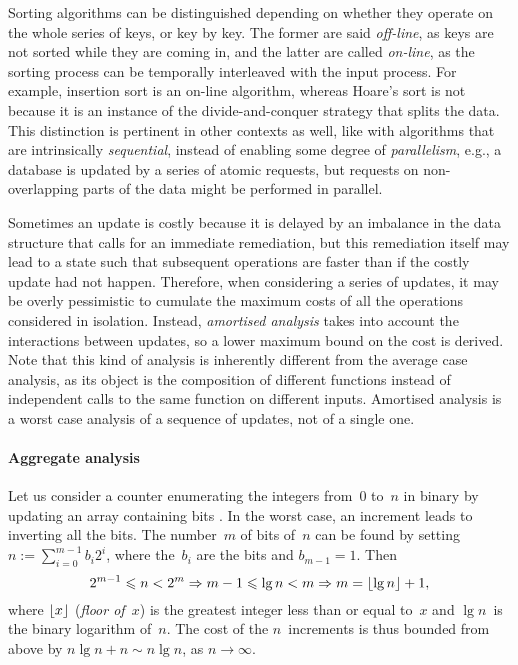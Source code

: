 Sorting algorithms can be distinguished depending on whether they
operate on the whole series of keys, or key by key. The former are
said \emph{off\hyp{}line}, as keys are not
sorted while they are coming in, and the latter are called
\emph{on\hyp{}line}, as the sorting process
can be temporally interleaved with the input process. For example,
insertion sort is an on\hyp{}line algorithm, whereas Hoare's sort is
not because it is an instance of the divide\hyp{}and\hyp{}conquer
strategy that splits the data. This distinction is pertinent in other
contexts as well, like with algorithms that are intrinsically
\emph{sequential}, instead of enabling some degree of
\emph{parallelism}, e.g., a database is updated by a series of atomic
requests, but requests on non\hyp{}overlapping parts of the data might
be performed in parallel.

\label{par:amortised_cost}

Sometimes an update is costly because it is delayed by an imbalance in
the data structure that calls for an immediate remediation, but this
remediation itself may lead to a state such that subsequent operations
are faster than if the costly update had not happen. Therefore, when
considering a series of updates, it may be overly pessimistic to
cumulate the maximum costs of all the operations considered in
isolation. Instead, \emph{amortised
  analysis} \citep{Okasaki_1998a} \citep[\S{}17]{CLRS_2009} takes into
account the interactions between updates, so a lower maximum bound on
the cost is derived. Note that this kind of analysis is inherently
different from the average case analysis, as its object is the
composition of different functions instead of independent calls to the
same function on different inputs. Amortised analysis is a worst case
analysis of a sequence of updates, not of a single one.


\paragraph{Aggregate analysis}
\label{par:aggregate}

Let us consider a counter enumerating the integers from~\(0\) to~\(n\)
in binary by updating an array containing
bits \cite[\S{}17.1]{CLRS_2009}. In the worst case, an increment leads
to inverting all the bits. The number~\(m\) of bits of~\(n\) can be
found by setting \(n := \sum_{i=0}^{m-1}{b_i2^i}\), where the~\(b_i\)
are the bits and \(b_{m-1}=1\). Then
\begin{equation}
2^{m-1} \leqslant n < 2^m \Rightarrow m - 1 \leqslant \lg n
< m \Rightarrow m = \lfloor{\lg n}\rfloor + 1,
\label{eq:num_of_bits}
\end{equation}
where \(\lfloor{x}\rfloor\) (\textsl{floor
  of~\(x\)}) is the greatest integer less than or equal to~\(x\) and
\(\lg n\)~is the binary logarithm of~\(n\). The cost of the
\(n\)~increments is thus bounded from above by \(n\lg n + n \sim n\lg
n\), as \(n \rightarrow \infty\).

